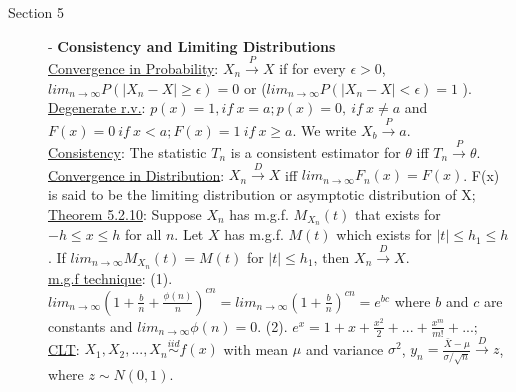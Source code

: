 \documentclass[10pt,landscape]{article}
\begin{document}
\begin{multicols}{3}
\begin{description}
    		
    \end{description}   
    
   \begin{description}  %
	\item[Section 5] - \textbf{Consistency and Limiting Distributions} \\
	\underline{Convergence in Probability}: $X_n \overset{P}{\rightarrow} X$ if for every $\epsilon > 0$, $lim_{n\rightarrow\infty} P(|X_n - X| \geq \epsilon) = 0$  or ($lim_{n\rightarrow\infty} P(|X_n - X| < \epsilon) = 1$ ).\\
	\underline{Degenerate r.v.}: $p(x) = 1, if\ x=a; p(x) = 0,\ if\ x\neq a$ and $F(x) = 0\ if\ x<a; F(x) = 1\ if\ x\geq a$. We write $X_b \overset{P}{\rightarrow}  a$. \\
	\underline{Consistency}: The statistic $T_n$ is a consistent estimator for $\theta$ iff $T_n \overset{P}{\rightarrow} \theta$. \\
	\underline{Convergence in Distribution}: $X_n \overset{D}{\rightarrow} X$ iff $lim_{n\rightarrow \infty} F_n(x) = F(x)$. F(x) is said to be the limiting distribution or asymptotic distribution of X; \\
	\underline{Theorem 5.2.10}: Suppose $X_n$ has m.g.f. $M_{X_n}(t)$ that exists for $-h\leq x \leq h$ for all $n$. Let $X$ has m.g.f. $M(t)$ which exists for $|t|\leq h_1 \leq h$. If $lim_{n\rightarrow \infty} M_{X_n}(t) = M(t)$ for $|t| \leq h_1$, then $X_n \overset{D}{\rightarrow} X$. \\
	\underline{m.g.f technique}: (1). $lim_{n\rightarrow \infty} (1 + \frac{b}{n} + \frac{\phi (n)}{n})^{cn} = lim_{n\rightarrow \infty} (1+\frac{b}{n})^{cn} = e^{bc}$ where $b$ and $c$ are constants and $lim_{n\rightarrow \infty} \phi(n) = 0$. (2). $e^x = 1 + x + \frac{x^2}{2} + ... + \frac{x^m}{m!} + ...$; \\
	\underline{CLT}: $X_1, X_2, ..., X_n \overset{iid}{\sim} f(x)$ with mean $\mu$ and variance $\sigma^2$, $y_n = \frac{\bar{X} - \mu }{\sigma / \sqrt{n}} \overset{D}{\rightarrow} z$, where $z \sim N(0, 1)$. \\
	
	
   \end{description} 
   

\end{multicols}
\end{document}
